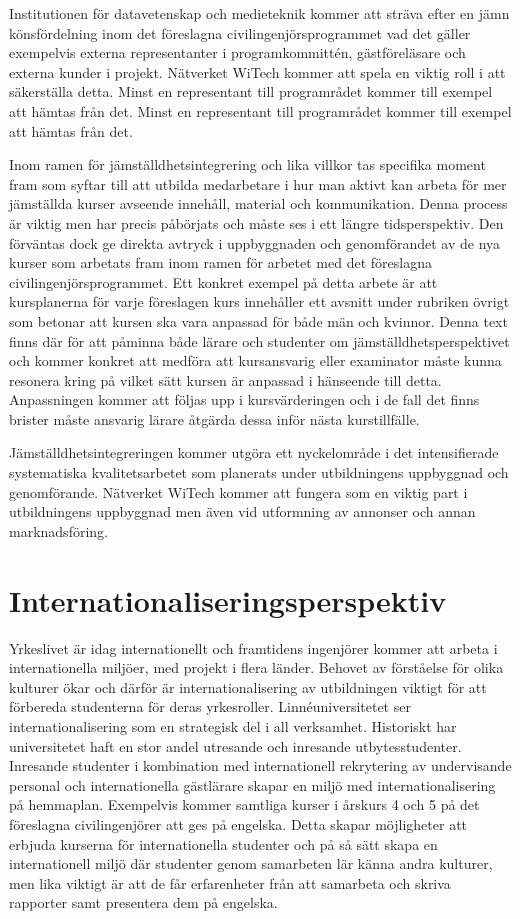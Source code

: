 Institutionen för datavetenskap och medieteknik kommer att sträva efter en jämn könsfördelning inom det föreslagna civilingenjörsprogrammet vad det gäller exempelvis externa representanter i programkommittén, gästföreläsare och externa kunder i projekt. Nätverket WiTech kommer att spela en viktig roll i att säkerställa detta. Minst en representant till programrådet kommer till exempel att hämtas från det.
 Minst en representant till programrådet kommer till exempel att hämtas från det. 

Inom ramen för jämställdhetsintegrering och lika villkor tas specifika moment fram som syftar till att utbilda medarbetare i hur man aktivt kan arbeta för mer jämställda kurser avseende innehåll, material och kommunikation. Denna process är viktig men har precis påbörjats och måste ses i ett längre tidsperspektiv. Den förväntas dock ge direkta avtryck i uppbyggnaden och genomförandet av de nya kurser som arbetats fram inom ramen för arbetet med det föreslagna civilingenjörsprogrammet. Ett konkret exempel på detta arbete är att kursplanerna för varje föreslagen kurs innehåller ett avsnitt under rubriken övrigt som betonar att kursen ska vara anpassad för både män och kvinnor. Denna text finns där för att påminna både lärare och studenter om jämställdhetsperspektivet och kommer konkret att medföra att kursansvarig eller examinator måste kunna resonera kring på vilket sätt kursen är anpassad i hänseende till detta. Anpassningen kommer att följas upp i kursvärderingen och i de fall det finns brister måste ansvarig lärare åtgärda dessa inför nästa kurstillfälle.

Jämställdhetsintegreringen kommer utgöra ett nyckelområde i det intensifierade systematiska kvalitetsarbetet som planerats under utbildningens uppbyggnad och genomförande. Nätverket WiTech kommer att fungera som en viktig part i utbildningens uppbyggnad men även vid utformning av annonser och annan marknadsföring.

\section{Internationaliseringsperspektiv}

Yrkeslivet är idag internationellt och framtidens ingenjörer kommer att arbeta i internationella miljöer, med projekt i flera länder. Behovet av förståelse för olika kulturer ökar och därför är internationalisering av utbildningen viktigt för att förbereda studenterna för deras yrkesroller. Linnéuniversitetet ser internationalisering som en strategisk del i all verksamhet. Historiskt har universitetet haft en stor andel utresande och inresande utbytesstudenter. Inresande studenter i kombination med internationell rekrytering av undervisande personal och internationella gästlärare skapar en miljö med internationalisering på hemmaplan. Exempelvis kommer samtliga kurser i årskurs 4 och 5 på det föreslagna civilingenjörer att ges på engelska. Detta skapar möjligheter att erbjuda kurserna för internationella studenter och på så sätt skapa en internationell miljö där studenter genom samarbeten lär känna andra kulturer, men lika viktigt är att de får erfarenheter från att samarbeta och skriva rapporter samt presentera dem på engelska.

